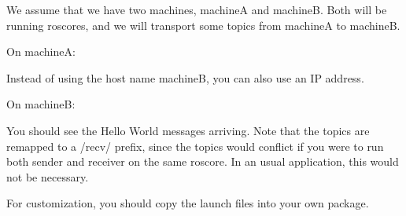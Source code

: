 We assume that we have two machines, machineA and machineB. Both will be running roscores, and we will transport some topics from machineA to machineB.

On machineA\+:


\begin{DoxyCode}{0}
\end{DoxyCode}


Instead of using the host name {\ttfamily machineB}, you can also use an IP address.

On machineB\+:


\begin{DoxyCode}{0}
\end{DoxyCode}


You should see the {\ttfamily Hello World} messages arriving. Note that the topics are remapped to a /recv/ prefix, since the topics would conflict if you were to run both sender and receiver on the same roscore. In an usual application, this would not be necessary.

For customization, you should copy the launch files into your own package. 